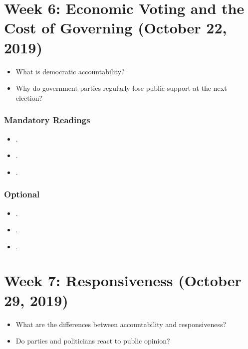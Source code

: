 \documentclass[abstract=on,parskip=full,headings=standardclasses,fontsize=11pt,paper=a4]{scrartcl}
\begin{document}
\section{Week 6: Economic Voting and the Cost of Governing (October 22, 2019)}


\begin{itemize}
\renewcommand\labelitemi{--}
\item What is democratic accountability?
\item Why do government parties  regularly lose public support at the next election?
\end{itemize}

\subsubsection*{Mandatory Readings}

\begin{itemize}
\item {}.
\item {}.
\item {}.
\end{itemize}


\subsubsection*{Optional}
\begin{itemize}
\item {}.
\item {}.
\item {}.
\end{itemize}

 

\section{Week 7:  Responsiveness (October 29, 2019)}



\begin{itemize}
\renewcommand\labelitemi{--}
\item What are the differences between accountability and responsiveness?
\item Do parties and politicians react to public opinion? 
\end{itemize}
\end{document}
